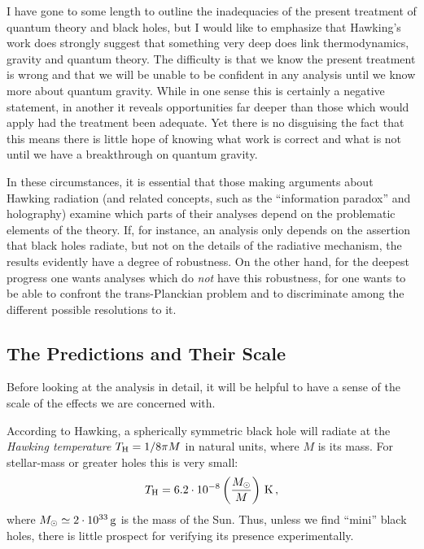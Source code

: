 \documentclass[
%
draft    %
,numberedheadings 
,bibliocites
  ]
  {aipproc}
\begin{document}
I have gone to some length to outline the inadequacies of the present treatment of quantum theory and black holes,
but I would like to emphasize that Hawking's work does 
strongly suggest that something very deep does link thermodynamics, gravity and quantum theory.  The difficulty is that we know the present treatment is wrong and that we will be unable to be confident in any analysis until we know more about quantum gravity.
While in one sense this is certainly a negative statement, in another it reveals opportunities far deeper than those which would apply had the treatment been adequate.
Yet there is no disguising the fact that this means there is little hope of knowing what work is correct 
and what is not until we have a breakthrough on quantum gravity.

In these circumstances, it is essential that those making arguments about Hawking radiation (and related concepts, such as the ``information paradox'' and  holography) examine which parts of their analyses depend on the problematic elements of the theory.  If, for instance, an analysis only depends on the assertion that black holes radiate, but not on the details of the radiative mechanism, the results evidently have a degree of robustness.  On the other hand, for the deepest progress one wants analyses which do {\em not} have this robustness, for one wants to be able to 
confront the trans-Planckian problem and to
discriminate among the different possible resolutions to it.


\subsection{The Predictions and Their Scale}

Before looking at the analysis in detail, it will be helpful to have a sense of the scale of the effects we are concerned with.

According to Hawking, a spherically symmetric black hole will radiate at the {\em Hawking temperature} $T_{\rm H}=1/8\pi M$ in natural units, where $M$ is its mass.  For stellar-mass or greater holes this is very small:
\begin{equation}
  T_{\rm H}=6.2\cdot 10^{-8} \left(\frac{M_\odot}{M}\right) \, {\rm K}\, ,
\end{equation}
where $M_\odot\simeq 2\cdot 10^{33}\, {\rm g}$ is the mass of the Sun.
Thus, unless we find ``mini'' black holes, there is little prospect for verifying its presence experimentally.
\end{document}
